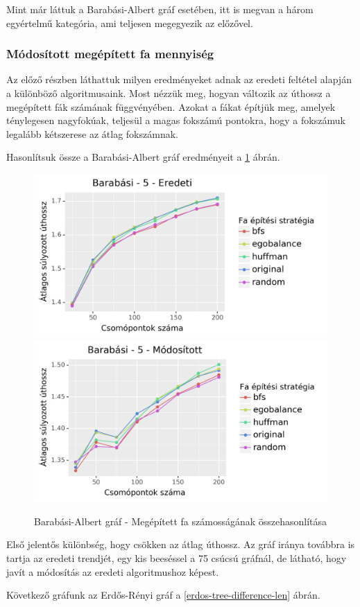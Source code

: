 \documentclass[12pt]{report}
\begin{document}
Mint már láttuk a Barabási-Albert gráf esetében, itt is megvan a három egyértelmű kategória, ami teljesen megegyezik az előzővel.

\subsubsection{Módosított megépített fa mennyiség}

Az előző részben láthattuk milyen eredményeket adnak az eredeti feltétel alapján a különböző algoritmusaink.
Most nézzük meg, hogyan változik az úthossz a megépített fák számának függvényében. 
Azokat a fákat építjük meg, amelyek ténylegesen nagyfokúak, teljesül a magas fokszámú pontokra, hogy a fokszámuk legalább kétszerese az átlag fokszámnak.

Hasonlítsuk össze a Barabási-Albert gráf eredményeit a \ref{barabasi-tree-difference-len} ábrán.

\begin{figure}[H]
	\begin{center}
		\includegraphics[width=0.49\linewidth]{pictures/barabasi_len_e.png}
		\includegraphics[width=0.49\linewidth]{pictures/barabasi_len_m.png}
		\caption{Barabási-Albert gráf - Megépített fa számosságának összehasonlítása}
		\label{barabasi-tree-difference-len}
	\end{center}
\end{figure}

Első jelentős különbség, hogy csökken az átlag úthossz.
Az gráf iránya továbbra is tartja az eredeti trendjét, egy kis beeséssel a 75 csúcsú gráfnál, de látható, hogy javít a módosítás az eredeti algoritmushoz képest.

Következő gráfunk az Erdős-Rényi gráf a \ref{erdos-tree-difference-len} ábrán.
\end{document}
